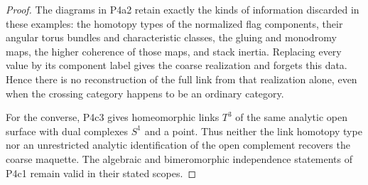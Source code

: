 \begin{proof}
The diagrams in P4a2 retain exactly the kinds of information discarded in these examples: the homotopy types of the normalized flag components, their angular torus bundles and characteristic classes, the gluing and monodromy maps, the higher coherence of those maps, and stack inertia. Replacing every value by its component label gives the coarse realization and forgets this data. Hence there is no reconstruction of the full link from that realization alone, even when the crossing category happens to be an ordinary category.

For the converse, P4c3 gives homeomorphic links $T^3$ of the same analytic open surface with dual complexes $S^1$ and a point. Thus neither the link homotopy type nor an unrestricted analytic identification of the open complement recovers the coarse maquette. The algebraic and bimeromorphic independence statements of P4c1 remain valid in their stated scopes.
\end{proof}
